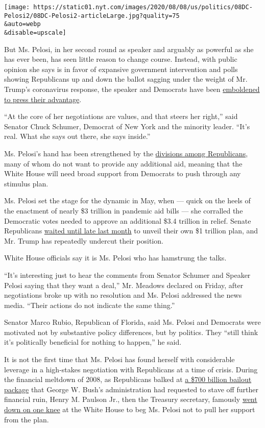 \texttt{[image: https://static01.nyt.com/images/2020/08/08/us/politics/08DC-Pelosi2/08DC-Pelosi2-articleLarge.jpg?quality=75\\\&auto=webp\\\&disable=upscale]}

But Ms. Pelosi, in her second round as speaker and arguably as powerful
as she has ever been, has seen little reason to change course. Instead,
with public opinion she says is in favor of expansive government
intervention and polls showing Republicans up and down the ballot
sagging under the weight of Mr. Trump's coronavirus response, the
speaker and Democrats have been
\href{https://www.nytimes.com/2020/04/23/us/coronavirus-democrats-strategy.html}{emboldened
to press their advantage}.

``At the core of her negotiations are values, and that steers her
right,'' said Senator Chuck Schumer, Democrat of New York and the
minority leader. ``It's real. What she says out there, she says
inside.''

Ms. Pelosi's hand has been strengthened by the
\href{https://www.nytimes.com/2020/07/22/us/politics/coronavirus-stimulus.html}{divisions
among Republicans}, many of whom do not want to provide any additional
aid, meaning that the White House will need broad support from Democrats
to push through any stimulus plan.

Ms. Pelosi set the stage for the dynamic in May, when --- quick on the
heels of the enactment of nearly \$3 trillion in pandemic aid bills ---
she corralled the Democratic votes needed to approve an additional \$3.4
trillion in relief. Senate Republicans
\href{https://www.nytimes.com/2020/05/15/us/coronavirus-republicans-blowback-aid.html}{waited
until late last month} to unveil their own \$1 trillion plan, and Mr.
Trump has repeatedly undercut their position.

White House officials say it is Ms. Pelosi who has hamstrung the talks.

``It's interesting just to hear the comments from Senator Schumer and
Speaker Pelosi saying that they want a deal,'' Mr. Meadows declared on
Friday, after negotiations broke up with no resolution and Ms. Pelosi
addressed the news media. ``Their actions do not indicate the same
thing.''

Senator Marco Rubio, Republican of Florida, said Ms. Pelosi and
Democrats were motivated not by substantive policy differences, but by
politics. They ``still think it's politically beneficial for nothing to
happen,'' he said.

It is not the first time that Ms. Pelosi has found herself with
considerable leverage in a high-stakes negotiation with Republicans at a
time of crisis. During the financial meltdown of 2008, as Republicans
balked at
\href{http://archive.nytimes.com/www.nytimes.com/packages/html/national/200904_CREDITCRISIS/recipients.html}{a
\$700 billion bailout package} that George W. Bush's administration had
requested to stave off further financial ruin, Henry M. Paulson Jr.,
then the Treasury secretary, famously
\href{https://www.nytimes.com/2008/09/26/business/26bailout.html}{went
down on one knee} at the White House to beg Ms. Pelosi not to pull her
support from the plan.

